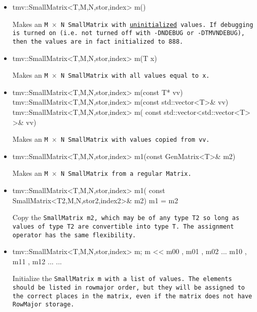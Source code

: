 \begin{itemize}
\item 
\begin{tmvcode}
tmv::SmallMatrix<T,M,N,stor,index> m()
\end{tmvcode}
Makes an \tt{M} $\times$ \tt{N} \tt{SmallMatrix} 
with \underline{uninitialized} values.
If debugging is turned on (i.e. not turned off
with \tt{-DNDEBUG} or \tt{-DTMVNDEBUG}), then the values are in fact initialized to 888. 

\item
\begin{tmvcode}
tmv::SmallMatrix<T,M,N,stor,index> m(T x)
\end{tmvcode}
Makes an \tt{M} $\times$ \tt{N} \tt{SmallMatrix} with all values equal to \tt{x}.

\item
\begin{tmvcode}
tmv::SmallMatrix<T,M,N,stor,index> m(const T* vv)
tmv::SmallMatrix<T,M,N,stor,index> m(const std::vector<T>& vv)
tmv::SmallMatrix<T,M,N,stor,index> m(
      const std::vector<std::vector<T> >& vv)
\end{tmvcode}
Makes an \tt{M} $\times$ \tt{N} \tt{SmallMatrix} with values copied from vv.

\item 
\begin{tmvcode}
tmv::SmallMatrix<T,M,N,stor,index> m1(const GenMatrix<T>& m2)
\end{tmvcode}
Makes an \tt{M} $\times$ \tt{N} \tt{SmallMatrix} from a regular \tt{Matrix}.

\item
\begin{tmvcode}
tmv::SmallMatrix<T,M,N,stor,index> m1(
      const SmallMatrix<T2,M,N,stor2,index2>& m2)
m1 = m2
\end{tmvcode}
Copy the \tt{SmallMatrix m2}, which may be of any type \tt{T2} so long
as values of type \tt{T2} are convertible into type \tt{T}.
The assignment operator has the same flexibility.

\item
\begin{tmvcode}
tmv::SmallMatrix<T,M,N,stor,index> m;
m << m00 , m01 , m02 ...
     m10 , m11 , m12 ...
     ...
\end{tmvcode}
Initialize the \tt{SmallMatrix m} with a list of values.  The elements should be listed in 
rowmajor order, but they will be assigned to the correct places in the matrix, even if the 
matrix does not have \tt{RowMajor} storage.

\end{itemize}



